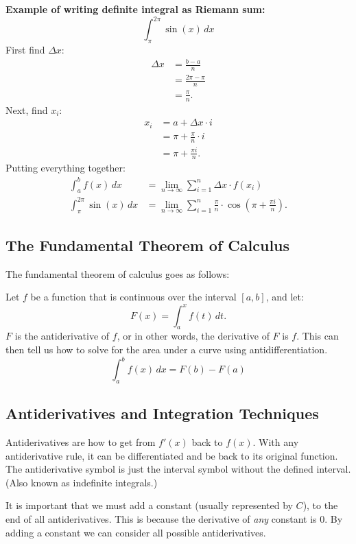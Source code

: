 \documentclass[12pt]{article}
\begin{document}
\textbf{Example of writing definite integral as Riemann sum:}
\[ \int_{\pi}^{2 \pi} \sin(x) \, dx \]
First find $\Delta x$:
\begin{align*}
	\Delta x & = \frac{b-a}{n}         \\[6pt]
	& = \frac{2 \pi - \pi}{n} \\[6pt]
	& = \frac{\pi}{n}.
\end{align*}
Next, find $x_i$:
\begin{align*}
	x_i & = a + \Delta x \cdot i        \\
	& = \pi + \frac{\pi}{n} \cdot i \\[6pt]
	& = \pi + \frac{\pi i}{n}.
\end{align*}
Putting everything together:
\begin{align*}
	\int_{a}^{b} f(x) \, dx          & = \lim_{n \to \infty} \sum_{i=1}^{n} \Delta x \cdot f(x_i)                                           \\[6pt]
	\int_{\pi}^{2 \pi} \sin(x) \, dx & = \lim_{n \to \infty} \sum_{i=1}^{n} \frac{\pi}{n} \cdot \cos{\left( \pi + \frac{\pi i}{n} \right)}.
\end{align*}

\subsection{The Fundamental Theorem of Calculus}
\noindent The fundamental theorem of calculus goes as follows:

\noindent Let $f$ be a function that is continuous over the interval $[a, b]$, and let:
\[ F(x) = \int_{a}^{x} f(t) \, dt. \]
$F$ is the antiderivative of $f$, or in other words, the derivative of $F$ is $f$. This can then tell us how to solve for the area under a curve using antidifferentiation.
\[ \int_{a}^{b} f(x) \, dx = F(b) - F(a) \]

\subsection{Antiderivatives and Integration Techniques}
Antiderivatives are how to get from $f'(x)$ back to $f(x)$. With any antiderivative rule, it can be differentiated and be back to its original function. The antiderivative symbol is just the interval symbol without the defined interval. (Also known as indefinite integrals.)

It is important that we must add a constant (usually represented by $C$), to the end of all antiderivatives. This is because the derivative of \textit{any} constant is $0$. By adding a constant we can consider all possible antiderivatives. %
\end{document}
